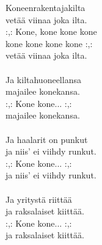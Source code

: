 
Koneenrakentajakilta \\ vetää viinaa joka ilta. \\ :,: Kone, kone kone kone  \\ kone kone kone kone :,: \\ vetää viinaa joka ilta. \\ \hspace{10mm} \\ Ja kiltahuoneellansa  \\ majailee konekansa. \\ :,: Kone kone... :,: \\ majailee konekansa. \\ \hspace{10mm} \\ Ja haalarit on punkut \\ ja niis' ei viihdy runkut. \\ :,: Kone kone... :,: \\ ja niis' ei viihdy runkut. \\ \hspace{10mm} \\ Ja yritystä riittää \\ ja raksalaiset kiittää. \\ :,: Kone kone... :,: \\ ja raksalaiset kiittää.